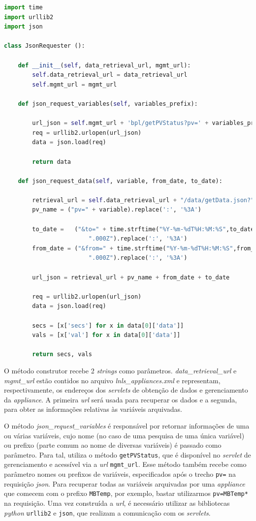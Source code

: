\begin{lstlisting}[language=Python]
import time
import urllib2
import json

class JsonRequester ():
    
    def __init__(self, data_retrieval_url, mgmt_url):
        self.data_retrieval_url = data_retrieval_url
        self.mgmt_url = mgmt_url
    
    def json_request_variables(self, variables_prefix):
        
        url_json = self.mgmt_url + 'bpl/getPVStatus?pv=' + variables_prefix
        req = urllib2.urlopen(url_json)
        data = json.load(req)
        
        return data
    
    def json_request_data(self, variable, from_date, to_date):    
        
        retrieval_url = self.data_retrieval_url + "/data/getData.json?"
        pv_name = ("pv=" + variable).replace(':', '%3A')
        
        to_date =   ("&to=" + time.strftime("%Y-%m-%dT%H:%M:%S",to_date) + 
        				".000Z").replace(':', '%3A')
        from_date = ("&from=" + time.strftime("%Y-%m-%dT%H:%M:%S",from_date) + 
        				".000Z").replace(':', '%3A')
                
        url_json = retrieval_url + pv_name + from_date + to_date
        
        req = urllib2.urlopen(url_json)
        data = json.load(req)
        
        secs = [x['secs'] for x in data[0]['data']]
        vals = [x['val'] for x in data[0]['data']]
        
        return secs, vals
\end{lstlisting}

O método construtor recebe 2 \textit{strings} como parâmetros.
\textit{data\_retrieval\_url} e \textit{mgmt\_url} estão contidos no arquivo
\textit{lnls\_appliances.xml} e representam, respectivamente, os endereços dos
\textit{servlets} de obtenção de dados e gerenciamento da \textit{appliance}. A
primeira \textit{url} será usada para recuperar os dados e a segunda, para obter
as informações relativas às variáveis arquivadas.

\vspace{12pt}

O método \textit{json\_request\_variables} é responsável por retornar
informações de uma ou várias variáveis, cujo nome (no caso de uma pesquisa de
uma única variável) ou prefixo (parte comum ao nome de diversas variáveis) é
passado como parâmetro. Para tal, utiliza o método \texttt{getPVStatus}, que é
disponível no \textit{servlet} de gerenciamento e acessível via a \textit{url}
\texttt{mgmt\_url}. Esse método também recebe como parâmetro nomes ou prefixos
de variáveis, especificados após o trecho \texttt{pv=} na requisição
\textit{json}. Para recuperar todas as variáveis arquivadas por uma
\textit{appliance} que comecem com o prefixo \texttt{MBTemp}, por exemplo,
bastar utilizarmos \texttt{pv=MBTemp*} na requisição. Uma vez construída a
\textit{url}, é necessário utilizar as bibliotecas \textit{python}
\texttt{urllib2} e \texttt{json}, que realizam a comunicação com os
\textit{servlets}. 

